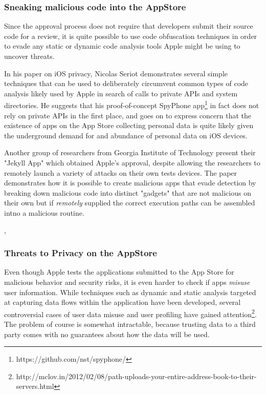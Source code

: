 \documentclass[12pt, titlepage, oneside]{article}
\begin{document}
\subsubsection{Sneaking malicious code into the AppStore}
Since the approval process does not require that developers submit their source code for a review, it is quite possible to use code obfuscation techniques in order to evade any static or dynamic code analysis tools Apple might be using to uncover threats. 

In his paper on iOS privacy\cite{priv}, Nicolas Seriot demonstrates several simple techniques that can be used to deliberately circumvent common types of code analysis likely used by Apple in search of calls to private APIs and system directories. He suggests that his proof-of-concept SpyPhone app\footnote{https://github.com/nst/spyphone/} in fact does not rely on private APIs in the first place, and goes on to express concern that the existence of apps on the App Store collecting personal data is quite likely given the underground demand for and abundance of personal data on iOS devices.

Another group of researchers from Georgia Institute of Technology present\cite{jekyll} their "Jekyll App" which obtained Apple's approval, despite allowing the researchers to remotely launch a variety of attacks on their own tests devices. The paper demonstrates how it is possible to create malicious apps that evade detection by breaking down malicious code into distinct "gadgets" that are not malicious on their own but if  \emph{remotely} supplied the correct execution paths can be assembled intno a malicious routine. 

\cite{attacks}, 
\subsubsection{Threats to Privacy on the AppStore}
Even though Apple tests the applications submitted to the App Store for malicious behavior and security risks, it is even harder to check if apps \emph{misuse} user information. While techniques such as dynamic \cite{dynamic} and static \cite{pios} analysis targeted at capturing data flows within the application have been developed, several controversial cases of user data misuse and user profiling have gained attention\footnote{http://mclov.in/2012/02/08/path-uploads-your-entire-address-book-to-their-servers.html}. The problem of course is somewhat intractable, because trusting data to a third party comes with no guarantees about how the data will be used. 
\end{document}
